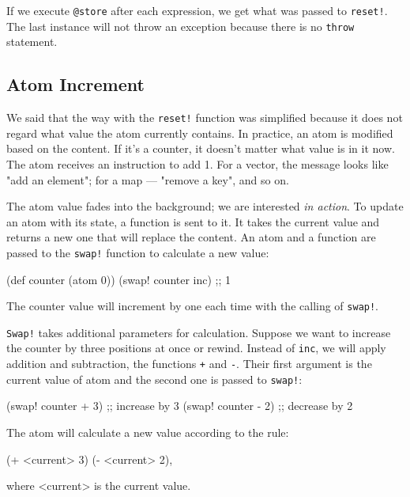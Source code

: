 If we execute \verb|@store| after each expression, we get what was passed to \verb|reset!|.
The last instance will not throw an exception because there is no \verb|throw| statement.

\subsection{Atom Increment}


We said that the way with the \verb|reset!| function was simplified because it does not regard what value the atom currently contains. In practice, an atom is modified based on the content.
If it's a counter, it doesn't matter what value is in it now. The atom receives an instruction to add 1.
For a vector, the message looks like "add an element"; for a map — "remove a key", and so on.

The atom value fades into the background; we are interested \emph{in action}.
To update an atom with its state, a function is sent to it. It takes the current value and returns a new one that will replace the content.
An atom and a function are passed to the \verb|swap!| function to calculate a new value:


\begin{clojure}
(def counter (atom 0))
(swap! counter inc) ;; 1
\end{clojure}

\noindent
The counter value will increment by one each time with the calling of \verb|swap!|.

\verb|Swap!| takes additional parameters for calculation.
Suppose we want to increase the counter by three positions at once or rewind. Instead of \verb|inc|, we will apply addition and subtraction, the functions \verb|+| and \verb|-|.
Their first argument is the current value of atom and the second one is passed to \verb|swap!|:

\begin{clojure}
(swap! counter + 3) ;; increase by 3
(swap! counter - 2) ;; decrease by 2
\end{clojure}

The atom will calculate a new value according to the rule:

\begin{clojure}
(+ <current> 3)
(- <current> 2),
\end{clojure}

\noindent
where <current> is the current value.

